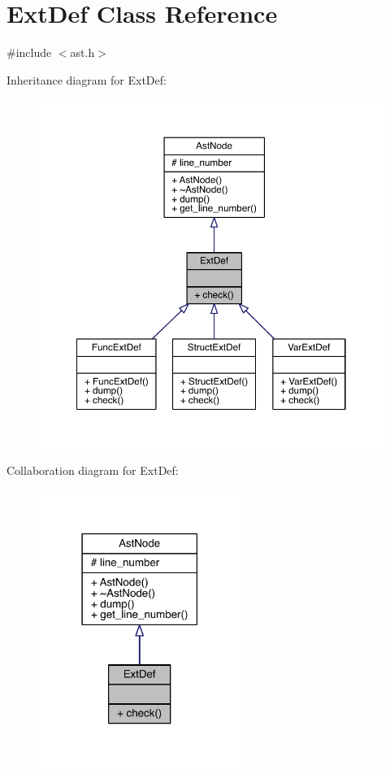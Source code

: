 \hypertarget{class_ext_def}{}\section{Ext\+Def Class Reference}
\label{class_ext_def}


{\ttfamily \#include $<$ast.\+h$>$}



Inheritance diagram for Ext\+Def\+:\nopagebreak
\begin{figure}[H]
\begin{center}
\leavevmode
\includegraphics[width=350pt]{class_ext_def__inherit__graph}
\end{center}
\end{figure}


Collaboration diagram for Ext\+Def\+:\nopagebreak
\begin{figure}[H]
\begin{center}
\leavevmode
\includegraphics[width=186pt]{class_ext_def__coll__graph}
\end{center}
\end{figure}
